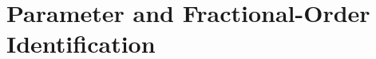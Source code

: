 \documentclass[00-main.tex]{subfiles}
\begin{document}
\section{Parameter and Fractional-Order Identification}
\end{document}
